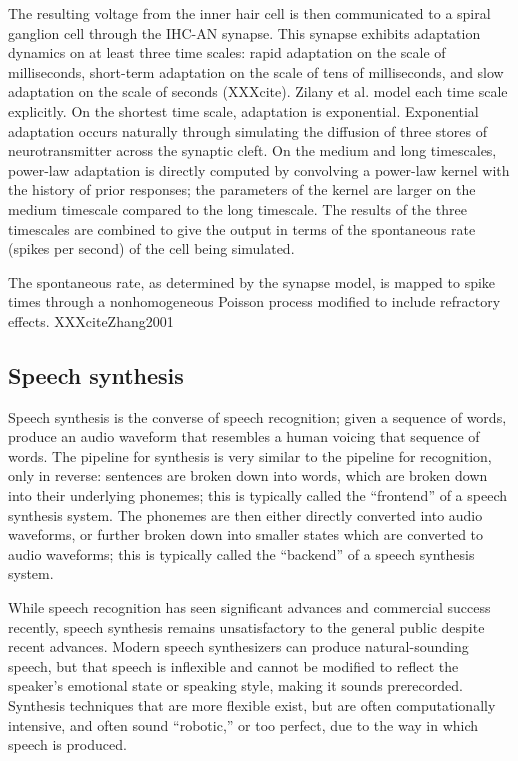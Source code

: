 \documentclass{article}
\begin{document}
The resulting voltage from the inner hair cell
is then communicated to a spiral ganglion cell
through the IHC-AN synapse.
This synapse exhibits adaptation dynamics
on at least three time scales:
rapid adaptation on the scale of milliseconds,
short-term adaptation on the scale of tens of milliseconds,
and slow adaptation on the scale of seconds
(XXXcite).
Zilany et al. model each time scale explicitly.
On the shortest time scale,
adaptation is exponential.
Exponential adaptation occurs naturally
through simulating the diffusion
of three stores of neurotransmitter
across the synaptic cleft.
On the medium and long timescales,
power-law adaptation is directly computed
by convolving a power-law kernel with
the history of prior responses;
the parameters of the kernel
are larger on the medium timescale
compared to the long timescale.
The results of the three timescales
are combined to give the output
in terms of the spontaneous rate
(spikes per second) of the cell being simulated.

The spontaneous rate,
as determined by the synapse model,
is mapped to spike times
through a nonhomogeneous Poisson process
modified to include refractory effects.
XXXciteZhang2001

\subsection{Speech synthesis}

Speech synthesis is the converse
of speech recognition;
given a sequence of words,
produce an audio waveform
that resembles a human
voicing that sequence of words.
The pipeline for synthesis is very similar
to the pipeline for recognition,
only in reverse:
sentences are broken down into words,
which are broken down into
their underlying phonemes;
this is typically called the
``frontend'' of a speech synthesis system.
The phonemes are then either
directly converted into audio waveforms,
or further broken down into
smaller states which are converted to audio waveforms;
this is typically called the ``backend''
of a speech synthesis system.

While speech recognition
has seen significant advances
and commercial success recently,
speech synthesis remains
unsatisfactory to the general public
despite recent advances.
Modern speech synthesizers can
produce natural-sounding speech,
but that speech is inflexible
and cannot be modified
to reflect the speaker's
emotional state or speaking style,
making it sounds prerecorded.
Synthesis techniques
that are more flexible exist,
but are often computationally intensive,
and often sound ``robotic,''
or too perfect,
due to the way in which
speech is produced.
\end{document}

